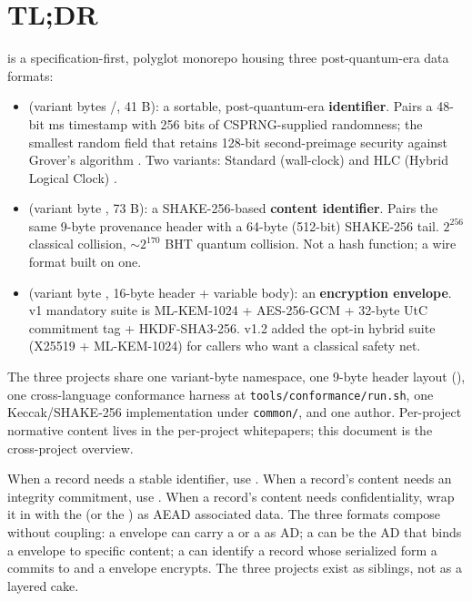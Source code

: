 \section*{TL;DR}

\tessera{} is a specification-first, polyglot monorepo housing three post-quantum-era data formats:

\begin{itemize}
\item \tesseraid{} (variant bytes /, 41 B): a sortable, post-quantum-era \textbf{identifier}. Pairs a 48-bit ms timestamp with 256 bits of CSPRNG-supplied randomness; the smallest random field that retains 128-bit second-preimage security against Grover's algorithm \citep{grover1996}. Two variants: Standard (wall-clock) and HLC (Hybrid Logical Clock) \citep{kulkarni2014hlc}.
\item \tesserahash{} (variant byte , 73 B): a SHAKE-256-based \textbf{content identifier}. Pairs the same 9-byte provenance header with a 64-byte (512-bit) SHAKE-256 \citep{fips202} tail. $2^{256}$ classical collision, $\sim 2^{170}$ BHT \citep{bht1998} quantum collision. Not a hash function; a wire format built on one.
\item \tesseraseal{} (variant byte , 16-byte header + variable body): an \textbf{encryption envelope}. v1 mandatory suite is ML-KEM-1024 \citep{fips203} + AES-256-GCM + 32-byte UtC commitment tag + HKDF-SHA3-256. v1.2 added the opt-in hybrid suite  (X25519 + ML-KEM-1024) for callers who want a classical safety net.
\end{itemize}

The three projects share one variant-byte namespace, one 9-byte header layout (), one cross-language conformance harness at \texttt{tools/conformance/run.sh}, one Keccak/SHAKE-256 implementation under \texttt{common/}, and one author. Per-project normative content lives in the per-project whitepapers; this document is the cross-project overview.

\begin{calloutinfo}
When a record needs a stable identifier, use \tesseraid{}. When a record's content needs an integrity commitment, use \tesserahash{}. When a record's content needs confidentiality, wrap it in \tesseraseal{} with the \tesseraid{} (or the \tesserahash{}) as AEAD associated data. The three formats compose without coupling: a \tesseraseal{} envelope can carry a \tesseraid{} or a \tesserahash{} as AD; a \tesserahash{} can be the AD that binds a \tesseraseal{} envelope to specific content; a \tesseraid{} can identify a record whose serialized form a \tesserahash{} commits to and a \tesseraseal{} envelope encrypts. The three projects exist as siblings, not as a layered cake.
\end{calloutinfo}

